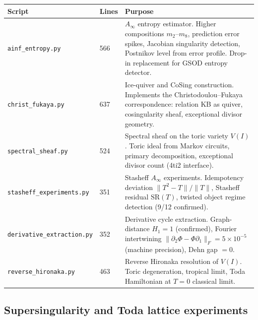 \documentclass[11pt]{amsart}
\theoremstyle{definition}
\begin{document}
\begin{center}
\renewcommand{\arraystretch}{1.2}
\small
\begin{tabular}{@{}p{4.2cm}p{1.0cm}p{8.2cm}@{}}
\toprule
Script & Lines & Purpose \\
\midrule
\texttt{ainf\_entropy.py} & 566 &
  $A_\infty$ entropy estimator.
  Higher compositions $m_2$--$m_8$, prediction error spikes,
  Jacobian singularity detection, Postnikov level from error profile.
  Drop-in replacement for GSOD entropy detector. \\
\texttt{christ\_fukaya.py} & 637 &
  Ice-quiver and CoSing construction.
  Implements the Christodoulou--Fukaya correspondence:
  relation KB as quiver, cosingularity sheaf,
  exceptional divisor geometry. \\
\texttt{spectral\_sheaf.py} & 524 &
  Spectral sheaf on the toric variety $V(I)$.
  Toric ideal from Markov circuits, primary decomposition,
  exceptional divisor count (4ti2 interface). \\
\texttt{stasheff\_experiments.py} & 351 &
  Stasheff $A_\infty$ experiments.
  Idempotency deviation $\|T^2-T\|/\|T\|$,
  Stasheff residual $\mathrm{SR}(T)$,
  twisted object regime detection (9/12 confirmed). \\
\texttt{derivative\_extraction.py} & 352 &
  Derivative cycle extraction.
  Graph-distance $H_1 = 1$ (confirmed),
  Fourier intertwining $\|\partial_2\Phi - \Phi\partial_1\|_F = 5\times10^{-5}$
  (machine precision), Dehn gap $= 0$. \\
\texttt{reverse\_hironaka.py} & 463 &
  Reverse Hironaka resolution of $V(I)$.
  Toric degeneration, tropical limit, Toda Hamiltonian
  at $T=0$ classical limit. \\
\bottomrule
\end{tabular}
\end{center}

\subsection{Supersingularity and Toda lattice experiments}
\end{document}
